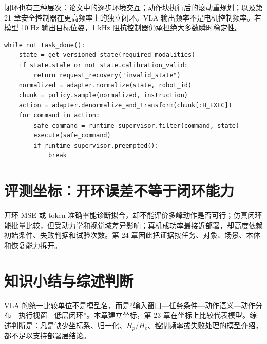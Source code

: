 闭环也有三种层次：论文中的逐步环境交互；动作块执行后的滚动重规划；以及第 21 章安全控制器在更高频率上的独立闭环。VLA 输出频率不是电机控制频率。若模型 10 Hz 输出目标位姿，1 kHz 阻抗控制器仍承担绝大多数瞬时稳定性。

\begin{lstlisting}[caption={动作块滚动执行的最小协议}]
while not task_done():
    state = get_versioned_state(required_modalities)
    if state.stale or not state.calibration_valid:
        return request_recovery("invalid_state")
    normalized = adapter.normalize(state, robot_id)
    chunk = policy.sample(normalized, instruction)
    action = adapter.denormalize_and_transform(chunk[:H_EXEC])
    for command in action:
        safe_command = runtime_supervisor.filter(command, state)
        execute(safe_command)
        if runtime_supervisor.preempted():
            break
\end{lstlisting}

\section{评测坐标：开环误差不等于闭环能力}

开环 MSE 或 token 准确率能诊断拟合，却不能评价多峰动作是否可行；仿真闭环能批量比较，但受动力学和视觉域差异影响；真机成功率最接近部署，却高度依赖初始条件、失败判据和试验次数。第 24 章因此把证据按任务、对象、场景、本体和恢复能力拆开。

\section{知识小结与综述判断}

VLA 的统一比较单位不是模型名，而是“输入窗口—任务条件—动作语义—动作分布—执行视窗—低层闭环”。本章建立坐标，第 23 章在坐标上比较代表模型。综述判断是：凡是缺少坐标系、归一化、$H_p/H_e$、控制频率或失败处理的模型介绍，都不足以支持部署层结论。
